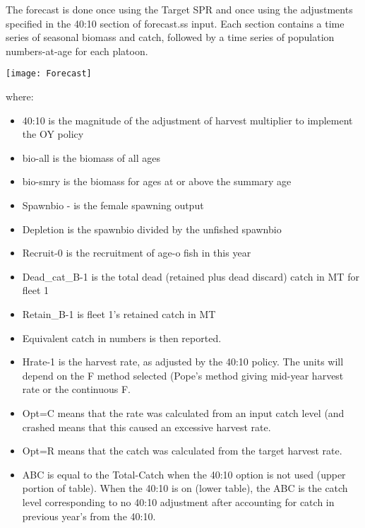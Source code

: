 \begin{landscape}
	The forecast is done once using the Target SPR and once using the adjustments specified in the 40:10 section of forecast.ss input.  Each section contains a time series of seasonal biomass and catch, followed by a time series of population numbers-at-age for each platoon.
	
	\begin{center}
		\texttt{[image: Forecast]}
	\end{center}
\end{landscape}

where:
\begin{itemize}
	\item 40:10 is the magnitude of the adjustment of harvest multiplier to implement the OY policy
	\item bio-all is the biomass of all ages
	\item bio-smry is the biomass for ages at or above the summary age
	\item Spawnbio - is the female spawning output
	\item Depletion is the spawnbio divided by the unfished spawnbio
	\item Recruit-0 is the recruitment of age-o fish in this year
	\item Dead\_cat\_B-1 is the total dead (retained plus dead discard) catch in MT for fleet 1
	\item Retain\_B-1 is fleet 1’s retained catch in MT
	\item Equivalent catch in numbers is then reported.
	\item Hrate-1 is the harvest rate, as adjusted by the 40:10 policy.  The units will depend on the F method selected (Pope’s method giving mid-year harvest rate or the continuous F.
	\item Opt=C means that the rate was calculated from an input catch level (and crashed means that this caused an excessive harvest rate.
	\item Opt=R means that the catch was calculated from the target harvest rate.
	\item ABC is equal to the Total-Catch when the 40:10 option is not used (upper portion of table).  When the 40:10 is on (lower table), the ABC is the catch level corresponding to no 40:10 adjustment after accounting for catch in previous year’s from the 40:10.
\end{itemize}

